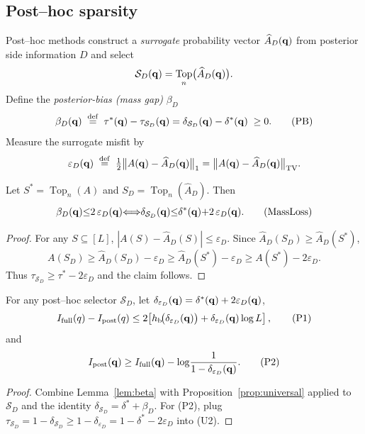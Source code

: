 \subsection{Post–hoc sparsity}

Post–hoc methods construct a \emph{surrogate} probability vector $\widehat A_D(\mathbf{q})$ from posterior side information $D$ and select
\[
\mathcal S_D(\mathbf{q})=\operatorname*{Top}_n\!\big(\widehat A_D(\mathbf{q})\big).
\]
Define the \emph{posterior-bias (mass gap)} $\beta_D$
\begin{equation}
\beta_D(\mathbf{q})\;\stackrel{\mathrm{def}}{=}\;\tau^{*}(\mathbf{q})-\tau_{\mathcal S_D}(\mathbf{q})
=\delta_{\mathcal S_D}(\mathbf{q})-\delta^{*}(\mathbf{q})\;\ge 0.
\tag{PB}
\end{equation}
Measure the surrogate misfit by
\begin{equation}
\varepsilon_D(\mathbf{q})\;\stackrel{\mathrm{def}}{=}\;\tfrac12\big\|A(\mathbf{q})-\widehat A_D(\mathbf{q})\big\|_1
=\big\|A(\mathbf{q})-\widehat A_D(\mathbf{q})\big\|_{\mathrm{TV}}.
\end{equation}

\begin{lemma}
\label{lem:beta}
Let $S^{*}=\operatorname*{Top}_n(A)$ and $S_D=\operatorname*{Top}_n(\widehat A_D)$. Then
\begin{equation}
\beta_D(\mathbf{q}){\le} 2\,\varepsilon_D(\mathbf{q})
{\Longleftrightarrow}
\delta_{\mathcal S_D}(\mathbf{q}){\le} \delta^{*}(\mathbf{q}){+}2\,\varepsilon_D(\mathbf{q}).
\tag{MassLoss}
\end{equation}
\begin{proof}
For any $S\subseteq[L]$, $|A(S)-\widehat A_D(S)|\le \varepsilon_D$. Since $\widehat A_D(S_D)\ge \widehat A_D(S^{*})$,
\[
A(S_D)\ge \widehat A_D(S_D)-\varepsilon_D \ge \widehat A_D(S^{*})-\varepsilon_D \ge A(S^{*})-2\varepsilon_D.
\]
Thus $\tau_{\mathcal S_D}\ge \tau^{*}-2\varepsilon_D$ and the claim follows.
\end{proof}
\end{lemma}

\begin{theorem}
\label{thm:posthoc}
For any post–hoc selector $\mathcal S_D$, let $\delta_{\varepsilon_D}(\mathbf{q})=\delta^{*}(\mathbf{q})+2\varepsilon_D(\mathbf{q})$,
\begin{align}
I_{\mathrm{full}}(q)-I_{\text{post}}(q) \le 2\!\left[
h_{\mathrm b}\!\big(\delta_{\varepsilon_D}(\mathbf{q})\big)
+\delta_{\varepsilon_D}(\mathbf{q})\log L
\right],
\tag{P1}
\end{align}
and
\begin{equation}
I_{\text{post}}(\mathbf{q}) \ge I_{\mathrm{full}}(\mathbf{q}) - \log\!\frac{1}{1-\delta_{\varepsilon_D}(\mathbf{q})}.
\tag{P2}
\end{equation}
\begin{proof}
Combine Lemma~\ref{lem:beta} with Proposition~\ref{prop:universal} applied to $\mathcal S_D$ and the identity $\delta_{\mathcal S_D}=\delta^{*}+\beta_D$.
For (P2), plug $\tau_{\mathcal S_D}=1-\delta_{\mathcal S_D}\ge 1-\delta_{\varepsilon_D}=1-\delta^{*}-2\varepsilon_D$ into (U2).
\end{proof}
\end{theorem}


